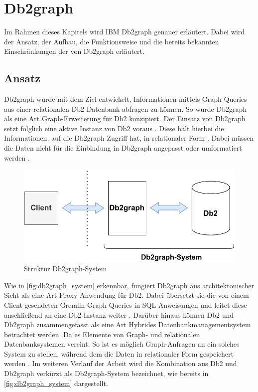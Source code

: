 \chapter{Db2graph}
\label{chap:db2graph}

Im Rahmen dieses Kapitels wird IBM Db2graph genauer erläutert. Dabei wird der Ansatz, der Aufbau, die Funktionsweise und die bereits bekannten Einschränkungen der von Db2graph erläutert. 

\section{Ansatz}
\label{db2graph:ansatz}
Db2graph wurde mit dem Ziel entwickelt, Informationen mittels Graph-Queries aus einer relationalen Db2 Datenbank abfragen zu können. So wurde Db2graph als eine Art Graph-Erweiterung für Db2 konzipiert. Der Einsatz von Db2graph setzt folglich eine aktive Instanz von Db2 voraus \cite{vldb_tian, sigmod_tian}. Diese hält hierbei die Informationen, auf die Db2graph Zugriff hat, in relationaler Form \cite{vldb_tian, sigmod_tian}. Dabei müssen die Daten nicht für die Einbindung in Db2graph angepasst oder umformatiert werden \cite{vldb_tian, sigmod_tian}.

\begin{figure}[h]
    \centering
    \includegraphics[width=\textwidth]{images/db2graph_system.pdf}
    \vspace{0.1em}
    \caption{Struktur Db2graph-System}
    \label{fig:db2graph_system}
\end{figure}

Wie in \autoref{fig:db2graph_system} erkennbar, fungiert Db2graph aus architektonischer Sicht als eine Art Proxy-Anwendung für Db2. Dabei übersetzt sie die von einem Client gesendeten Gremlin-Graph-Queries in SQL-An\-wei\-sung\-en und leitet diese anschließend an eine Db2 Instanz weiter \cite{vldb_tian, sigmod_tian}. Darüber hinaus können Db2 und Db2graph zusammengefasst als eine Art Hybrides Datenbankmanagementsystem betrachtet werden. Da es Elemente von Graph- und relationalen Datenbanksystemen vereint. So ist es möglich Graph-Anfragen an ein solches System zu stellen, während dem die Daten in relationaler Form gespeichert werden \cite{vldb_tian, sigmod_tian}. Im weiteren Verlauf der Arbeit wird die Kombination aus Db2 und Db2graph verkürzt als Db2graph-System bezeichnet, wie bereits in \autoref{fig:db2graph_system} dargestellt. 

